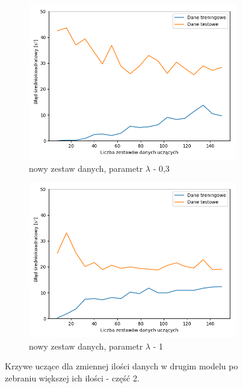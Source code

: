 \documentclass[12pt]{aghdpl}
\begin{document}
		\begin{figure}[h]
			\centering
		 	\begin{subfigure}{.8\linewidth}
		 		\includegraphics[width =\linewidth]{wykresy/8_zebranie_wiekszej_ilosci_danych/200-400/regularyzacja_0_3_learning_curves.png}
		 		\caption{nowy zestaw danych, parametr $\lambda$ - 0,3}
		 	\end{subfigure}
		 	\begin{subfigure}{.8\linewidth}
		 		\includegraphics[width =\linewidth]{wykresy/8_zebranie_wiekszej_ilosci_danych/200-400/regularyzacja_1_learning_curves.png}
		 		\caption{nowy zestaw danych, parametr $\lambda$ - 1}
		 	\end{subfigure}
		 	
		 	\caption{Krzywe uczące dla zmiennej ilości danych w drugim modelu po zebraniu większej ich ilości - część 2.}
			\label{fig: drugi_model_po_zebraniu_wiekszej_ilosci_danych_learning_curves_2}
		\end{figure}
		
\end{document}
